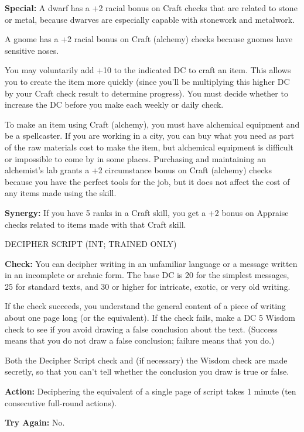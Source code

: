 \documentclass{article}
\begin{document}
\textbf{Special:} A dwarf has a +2 racial bonus on Craft checks that are related 
to stone or metal, because dwarves are especially capable with stonework and metalwork.

A gnome has a +2 racial bonus on Craft (alchemy) checks because gnomes have sensitive 
noses.

You may voluntarily add +10 to the indicated DC to craft an item. This allows you 
to create the item more quickly (since you'll be multiplying this higher DC by 
your Craft check result to determine progress). You must decide whether to increase 
the DC before you make each weekly or daily check.

To make an item using Craft (alchemy), you must have alchemical equipment and be 
a spellcaster. If you are working in a city, you can buy what you need as part 
of the raw materials cost to make the item, but alchemical equipment is difficult 
or impossible to come by in some places. Purchasing and maintaining an alchemist's 
lab grants a +2 circumstance bonus on Craft (alchemy) checks because you have the 
perfect tools for the job, but it does not affect the cost of any items made using 
the skill.

\textbf{Synergy:} If you have 5 ranks in a Craft skill, you get a +2 bonus on Appraise 
checks related to items made with that Craft skill.

\vspace{12pt}
DECIPHER SCRIPT (INT; TRAINED ONLY)

\textbf{Check:} You can decipher writing in an unfamiliar language or a message 
written in an incomplete or archaic form. The base DC is 20 for the simplest messages, 
25 for standard texts, and 30 or higher for intricate, exotic, or very old writing.

If the check succeeds, you understand the general content of a piece of writing 
about one page long (or the equivalent). If the check fails, make a DC 5 Wisdom 
check to see if you avoid drawing a false conclusion about the text. (Success means 
that you do not draw a false conclusion; failure means that you do.)

Both the Decipher Script check and (if necessary) the Wisdom check are made secretly, 
so that you can't tell whether the conclusion you draw is true or false.

\textbf{Action:} Deciphering the equivalent of a single page of script takes 1 
minute (ten consecutive full-round actions).

\textbf{Try Again:} No.
\end{document}
